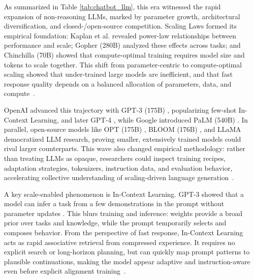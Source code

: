 As summarized in Table \ref{tab:chatbot_llm}, this era witnessed the rapid expansion of non-reasoning LLMs, marked by parameter growth, architectural diversification, and closed-/open-source competition. Scaling Laws formed its empirical foundation: Kaplan et al. \cite{kaplan2020scaling} revealed power-law relationships between performance and scale; Gopher (280B) \cite{rae2021scaling} analyzed these effects across tasks; and Chinchilla (70B) \cite{hoffmann2022chinchilla} showed that compute-optimal training requires model size and tokens to scale together. This shift from parameter-centric to compute-optimal scaling showed that under-trained large models are inefficient, and that fast response quality depends on a balanced allocation of parameters, data, and compute~\citep{zheng2023ddcot,chen2025beyond,wen2025reinforcement,wang2026reinforcement,tang2026beyond,feng2026self,upadhyaya2024internalized,wang2024theoretical,liu2025monte,gao2024interpretable}.

OpenAI advanced this trajectory with GPT-3 (175B) \cite{brown2020language}, popularizing few-shot In-Context Learning, and later GPT-4 \cite{achiam2023gpt}, while Google introduced PaLM (540B) \cite{chowdhery2022palm}. In parallel, open-source models like OPT (175B) \cite{zhang2022opt}, BLOOM (176B) \cite{bigscience2022bloom}, and LLaMA \cite{touvron2023llama} democratized LLM research, proving smaller, extensively trained models could rival larger counterparts. This wave also changed empirical methodology: rather than treating LLMs as opaque, researchers could inspect training recipes, adaptation strategies, tokenizers, instruction data, and evaluation behavior, accelerating collective understanding of scaling-driven language generation~\citep{song2026maniplvm,liu2026trust,zhang2025surveyrl,liu2025enhancing,stojanovski2026reasoning}.

A key scale-enabled phenomenon is In-Context Learning. GPT-3 showed that a model can infer a task from a few demonstrations in the prompt without parameter updates \cite{brown2020language}. This blurs training and inference: weights provide a broad prior over tasks and knowledge, while the prompt temporarily selects and composes behavior. From the perspective of fast response, In-Context Learning acts as rapid associative retrieval from compressed experience. It requires no explicit search or long-horizon planning, but can quickly map prompt patterns to plausible continuations, making the model appear adaptive and instruction-aware even before explicit alignment training~\citep{han2026bridging,liu2026prorl,berti2025specializing,havrilla2024teaching,pan2026reward}.

